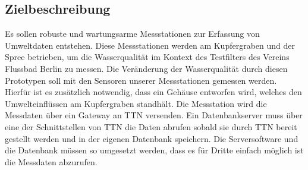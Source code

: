\subsection{Zielbeschreibung}

Es sollen robuste und wartungsarme Messstationen zur Erfassung von Umweltdaten entstehen. Diese Messstationen werden am Kupfergraben und
der Spree betrieben, um die Wasserqualität im Kontext des Testfilters des Vereins Flussbad Berlin zu messen. Die Veränderung der Wasserqualität
durch diesen Prototypen soll mit den Sensoren unserer Messstationen gemessen werden. Hierfür ist es zusätzlich notwendig, dass ein Gehäuse entworfen
wird, welches den Umwelteinflüssen am Kupfergraben standhält.\newline
Die Messstation wird die Messdaten über ein Gateway an TTN versenden. Ein Datenbankserver muss über eine der Schnittstellen von TTN die Daten
abrufen sobald sie durch TTN bereit gestellt werden und in der eigenen Datenbank speichern. Die Serversoftware und die Datenbank müssen so
umgesetzt werden, dass es für Dritte einfach möglich ist die Messdaten abzurufen.
